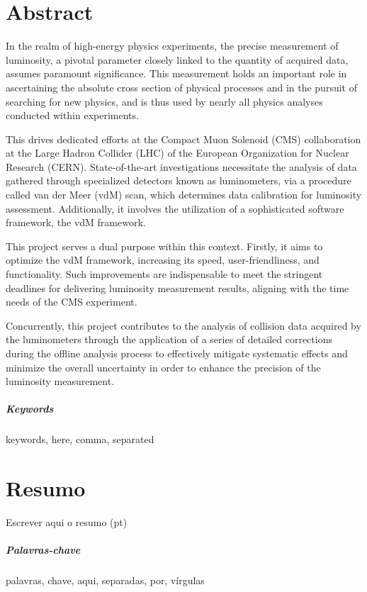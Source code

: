 \chapter*{Abstract}

In the realm of high-energy physics experiments, the precise measurement of luminosity, a pivotal parameter closely linked to the quantity of acquired data, assumes paramount significance.
This measurement holds an important role in ascertaining the absolute cross section of physical processes and in the pursuit of searching for new physics,
and is thus used by nearly all physics analyses conducted within experiments.

This drives dedicated efforts at the Compact Muon Solenoid (CMS) collaboration at the Large Hadron Collider (LHC) of the European Organization for Nuclear Research (CERN).
State-of-the-art investigations necessitate the analysis of data gathered through specialized detectors known as luminometers, 
via a procedure called van der Meer (vdM) scan, which determines data calibration for luminosity assessment.
Additionally, it involves the utilization of a sophisticated software framework, the vdM framework.

This project serves a dual purpose within this context. Firstly, it aims to optimize the vdM framework, increasing its speed, user-friendliness, and functionality.
Such improvements are indispensable to meet the stringent deadlines for delivering luminosity measurement results, aligning with the time needs of the CMS experiment.

Concurrently, this project contributes to the analysis of collision data
acquired by the luminometers through the application of a series of detailed
corrections during the offline analysis process to effectively mitigate systematic effects and minimize the overall uncertainty in order to enhance the
precision of the luminosity measurement.

\paragraph{Keywords} keywords, here, comma, separated

\cleardoublepage

\chapter*{Resumo}

Escrever aqui o resumo (pt)

\paragraph{Palavras-chave} palavras, chave, aqui, separadas, por, vírgulas

\cleardoublepage
